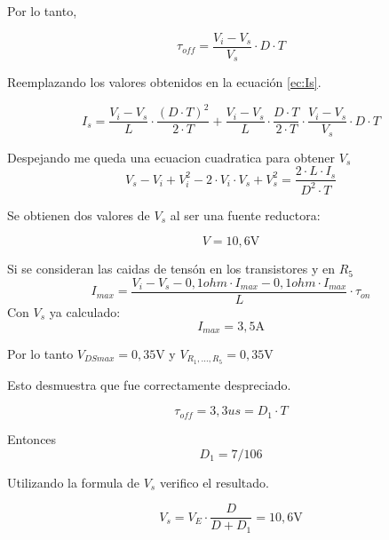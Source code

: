 Por lo tanto,

\begin{equation}
 	\si{\tau}_{off}  = \frac{{V_{i} - V_{s}}}{V_s} \cdot D \cdot T 
\end{equation}

Reemplazando los valores obtenidos en la ecuación \eqref{ec:Is}.

\begin{equation}
 	I_s = \frac{{V_{i} - V_{s}}}{L} \cdot \frac{(D \cdot T)^2 }{2 \cdot T} + \frac{{V_{i} - V_{s}}}{L} \cdot \frac{D \cdot T }{2 \cdot T} \cdot \frac{{V_{i} - V_{s}}}{V_s} \cdot D \cdot T
\end{equation}

Despejando me queda una ecuacion cuadratica para obtener $V_s$
\begin{equation}
	V_s - V_i + V^2_i -2 \cdot V_i \cdot V_s + V^2_s =  \frac{2 \cdot L \cdot I_s}{D^2 \cdot T}
\end{equation}

Se obtienen dos valores de $V_s$ al ser una fuente reductora:

\begin{equation}
 	 \boxed{V = 10,6\si{\volt} }
\end{equation}

Si se consideran las caidas de tensón en los transistores y en $R_5$
\begin{equation}
	I_{max} = \frac{V_i - V_s - 0,1 \si{ohm} \cdot I_{max} - 0,1 \si{ohm} \cdot I_{max} }{L} \cdot \si{\tau}_{on}
\end{equation}
Con $V_s$ ya calculado:
\begin{equation}
	 \boxed{I_{max} = 3,5 \si{\ampere}}
\end{equation}


Por lo tanto $V_{DSmax} = 0,35 \si{\volt}$ y $V_{R_1,...,R_5} = 0,35 \si{\volt}$

Esto desmuestra que fue correctamente despreciado.


\begin{equation}
	\boxed{\tau_{off} = 3,3 us = D_1 \cdot T}
\end{equation}

Entonces
\begin{equation}
 	\boxed{D_1  = 7/ 106 }
\end{equation}

Utilizando la formula de $V_s$ verifico el resultado.

\begin{equation}
 	V_s  = V_E \cdot \frac{D}{D + D_1} = 10,6\si{\volt}
\end{equation}
